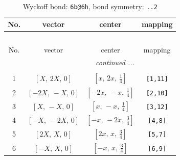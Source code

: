 \documentclass[fleqn,8pt]{jsarticle}
\begin{document}
\begin{longtable}{cccc}
\caption{Wyckoff bond: {\tt 6b@6h}, bond symmetry: {\tt ..2}}
 \\
 \hline \hline
No. & vector & center & mapping \\ \hline \endfirsthead

\multicolumn{3}{l}{\tablename\ \thetable{}} \\
 \hline \hline
No. & vector & center & mapping \\ \hline \endhead

 \hline \hline
\multicolumn{3}{r}{\footnotesize\it continued ...} \\ \endfoot

 \hline \hline
\multicolumn{3}{r}{} \\ \endlastfoot

1 & $\left[ X,\, 2 X,\, 0 \right]$ & $\left[ x,\, 2 x,\, \frac{1}{4} \right]$ & {\tt [1,11]} \\ \hline
2 & $\left[ - 2 X,\, - X,\, 0 \right]$ & $\left[ - 2 x,\, - x,\, \frac{1}{4} \right]$ & {\tt [2,10]} \\ \hline
3 & $\left[ X,\, - X,\, 0 \right]$ & $\left[ x,\, - x,\, \frac{1}{4} \right]$ & {\tt [3,12]} \\ \hline
4 & $\left[ - X,\, - 2 X,\, 0 \right]$ & $\left[ - x,\, - 2 x,\, \frac{3}{4} \right]$ & {\tt [4,8]} \\ \hline
5 & $\left[ 2 X,\, X,\, 0 \right]$ & $\left[ 2 x,\, x,\, \frac{3}{4} \right]$ & {\tt [5,7]} \\ \hline
6 & $\left[ - X,\, X,\, 0 \right]$ & $\left[ - x,\, x,\, \frac{3}{4} \right]$ & {\tt [6,9]} \\
\end{longtable}
\renewcommand{\arraystretch}{1.2}
\end{document}
